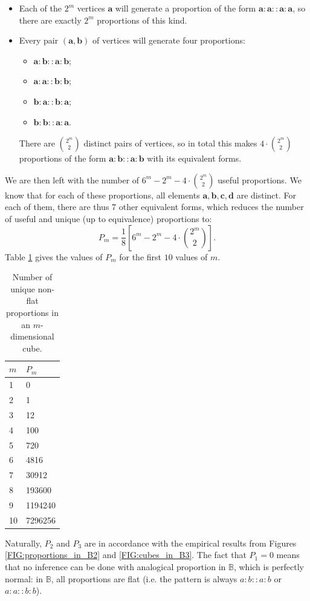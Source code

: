 \begin{itemize}
  \item Each of the $2^m$ vertices $\mathbf{a}$ will generate a proportion of the
    form $\mathbf{a}: \mathbf{a} :: \mathbf{a} : \mathbf{a}$, so there are
    exactly $2^m$ proportions of this kind.
  \item Every pair $(\mathbf{a}, \mathbf{b})$ of vertices will generate four
    proportions:
    \begin{itemize}
      \item $\mathbf{a}: \mathbf{b} :: \mathbf{a} : \mathbf{b}$;
      \item $\mathbf{a}: \mathbf{a} :: \mathbf{b} : \mathbf{b}$;
      \item $\mathbf{b}: \mathbf{a} :: \mathbf{b} : \mathbf{a}$;
      \item $\mathbf{b}: \mathbf{b} :: \mathbf{a} : \mathbf{a}$.
    \end{itemize}
    There are $\binom{2^m}{2}$ distinct pairs of vertices, so in total this
    makes $4\cdot \binom{2^m}{2}$ proportions of the form $\mathbf{a}: \mathbf{b} ::
    \mathbf{a} : \mathbf{b}$ with its equivalent forms.
\end{itemize}

We are then left with the number of $6^m - 2^m - 4\cdot\binom{2^m}{2}$ useful
proportions. We know that for each of these proportions, all elements
$\mathbf{a}, \mathbf{b}, \mathbf{c}, \mathbf{d}$  are distinct. For each of
them, there are thus 7 other equivalent forms, which reduces the number of
useful and unique (up to equivalence) proportions to:
$$P_m = \frac{1}{8} \left[6^m - 2^m - 4\cdot\binom{2^m}{2} \right].$$
Table \ref{TAB:n_params_in_cube} gives the values of $P_m$ for the first $10$
values of $m$.
\begin{table}[h!]
\centering
  \begin{tabular}{ l  l }
\toprule
 $m$ & $P_m$\\
\midrule
    1	&	0\\
    2 &	1\\
    3	&	12\\
    4	&	100\\
    5 &	720\\
    6 &	4816\\
    7 &	30912\\
    8 &	193600\\
    9 & 1194240\\
    10 & 7296256\\
\bottomrule
\end{tabular}
\caption{Number of unique non-flat proportions in an $m$-dimensional cube.}
\label{TAB:n_params_in_cube}
\end{table}
Naturally, $P_2$ and $P_3$ are in accordance with the empirical  results from
Figures \ref{FIG:proportions_in_B2} and \ref{FIG:cubes_in_B3}. The fact that
$P_1 = 0$ means that no inference can be done with analogical proportion in
$\mathbb{B}$, which is perfectly normal: in $\mathbb{B}$, all proportions are
flat (i.e. the pattern is always $a:b::a:b$ or $a:a::b:b$).

